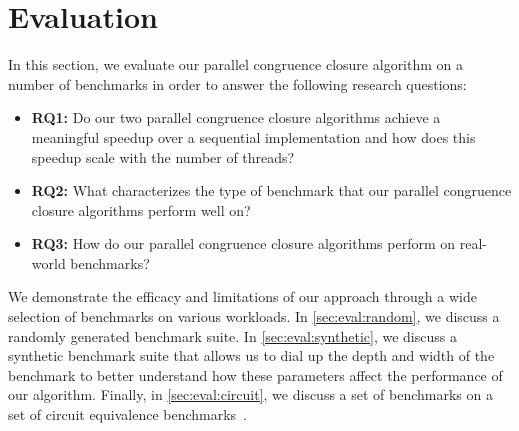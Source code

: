 \section{Evaluation}
\label{sec:eval}

In this section, we evaluate our parallel congruence closure algorithm on a
number of benchmarks in order to answer the following research questions:

\begin{itemize}
  \item \textbf{RQ1:} Do our two parallel congruence closure algorithms achieve
  a meaningful speedup over a sequential implementation and how does this
  speedup scale with the number of threads?
  \item \textbf{RQ2:} What characterizes the type of benchmark that our parallel
  congruence closure algorithms perform well on?
  \item \textbf{RQ3:} How do our parallel congruence closure algorithms perform
  on real-world benchmarks?
\end{itemize}

We demonstrate the efficacy and limitations of our approach through a wide
selection of benchmarks on various workloads. In \autoref{sec:eval:random}, we
discuss a randomly generated benchmark suite. In \autoref{sec:eval:synthetic},
we discuss a synthetic benchmark suite that allows us to dial up the depth and
width of the benchmark to better understand how these parameters affect the
performance of our algorithm. Finally, in \autoref{sec:eval:circuit}, we discuss
a set of benchmarks on a set of circuit equivalence
benchmarks~\cite{clausal-cc}.



